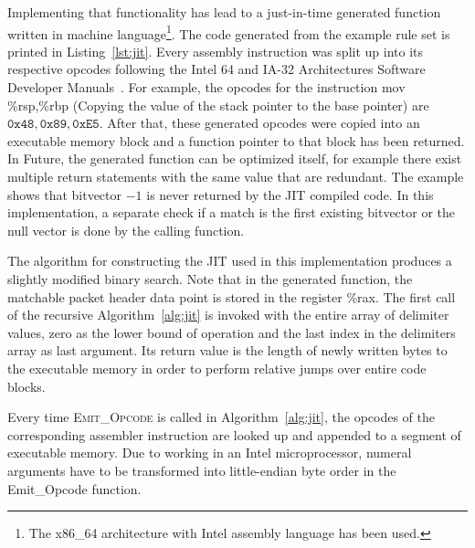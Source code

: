 \documentclass[a4paper,
		12pt,
		parskip=full,
		titlepage
		]{scrartcl}
\begin{document}
Implementing that functionality has lead to a just-in-time generated function written in machine 
language\footnote{The x86\_64 architecture with Intel assembly language has been used.}.
The code generated from the example rule set is printed in Listing~\ref{lst:jit}.
Every assembly instruction was split up into its respective opcodes following the 
Intel 64 and IA-32 Architectures Software Developer Manuals~\cite{intelsys}.
For example, the opcodes for the instruction 
\textsf{mov \%rsp,\%rbp} (Copying the value of the stack pointer to the base pointer) 
are $\texttt{0x48}, \texttt{0x89}, \texttt{0xE5}$.
After that, these generated opcodes were copied into an executable memory block and a function pointer to that block has been returned.
In Future, the generated function can be optimized itself, for example there exist multiple 
return statements with the same value that are redundant.
The example shows that bitvector $-1$ is never returned by the JIT compiled code.
In this implementation, a separate check if a match is the first existing bitvector or the null 
vector is done by the calling function.

The algorithm for constructing the JIT used in this implementation produces a slightly modified binary search.
Note that in the generated function, the matchable packet header data point is stored in the register \textsf{\%rax}.
The first call of the recursive Algorithm~\ref{alg:jit} is invoked with the entire array of delimiter values,
zero as the lower bound of operation and the last index in the delimiters array as last argument.
Its return value is the length of newly written bytes to the executable memory in order to perform relative jumps over entire code blocks.

Every time \textsc{Emit\_Opcode} is called in Algorithm~\ref{alg:jit}, the opcodes 
of the corresponding assembler instruction are looked up and appended to a segment of executable memory.
Due to working in an Intel microprocessor, numeral arguments have to be 
transformed into little-endian byte order in the \textsf{Emit\_Opcode} function.
\end{document}
